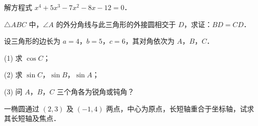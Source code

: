 \begin{question}
解方程式 $x^4+5x^3-7x^2-8x-12=0$．

\end{question}
\begin{question}
$\triangle ABC$ 中，$\angle A$ 的外分角线与此三角形的外接圆相交于 $D$，求证：$BD=CD$．

\end{question}
\begin{question}
设三角形的边长为 $a=4$，$b=5$，$c=6$，其对角依次为 $A$，$B$，$C$．

  (1) 求 $\cos C$；

  (2) 求 $\sin C$，$\sin B$，$\sin A$；

  (3) 问 $A$，$B$，$C$ 三个角各为锐角或钝角？

\end{question}
\begin{question}
一椭圆通过 $(2,3)$ 及 $(-1,4)$ 两点，中心为原点，长短轴重合于坐标轴，试求其长短轴及焦点．

\end{question}